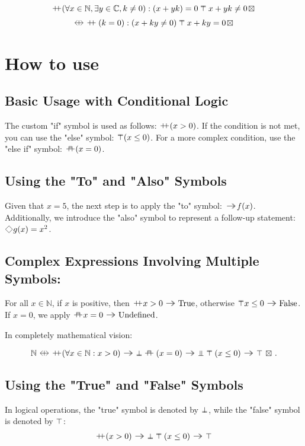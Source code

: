 \documentclass{iac}
\begin{document}
$$ \ifL (\forall x \in \mathbb{N}, \exists y \in \mathbb{C}, k\not= 0) : (x + yk) = 0 \elseL x + yk \not= 0 \doneL$$
$$ \logicalEquL \ifL (k = 0) : (x + ky \not= 0) \elseL x + ky = 0 \doneL $$

\section{How to use}

\subsection{Basic Usage with Conditional Logic}

The custom "if" symbol is used as follows: $\ifL (x > 0)$. 
If the condition is not met, you can use the "else" symbol: $\elseL (x \leq 0)$.
For a more complex condition, use the "else if" symbol: $\elifL (x = 0)$.

\subsection{Using the "To" and "Also" Symbols}

Given that $x = 5$, the next step is to apply the "to" symbol: $\toL f(x)$.
Additionally, we introduce the "also" symbol to represent a follow-up statement: 
$\alsoL g(x) = x^2$.

\subsection{Complex Expressions Involving Multiple Symbols:}

For all $x \in \mathbb{N}$, if $x$ is positive, then $\ifL x > 0 \toL \text{True}$, 
otherwise $\elseL x \leq 0 \toL \text{False}$.
If $x = 0$, we apply $\elifL x = 0 \toL \text{Undefined}$.

In completely mathematical vision:

$$ \mathbb{N} \logicalEquL \ifL (\forall x \in \mathbb{N} : x > 0) \toL \trueL \elifL (x = 0) \toL \undefinedL \elseL (x \leq 0) \toL \falseL \doneL. $$

\subsection{Using the "True" and "False" Symbols}

In logical operations, the "true" symbol is denoted by $\trueL$, while the "false" symbol is denoted by $\falseL$:
$$\ifL (x > 0) \toL \trueL  \elseL (x \leq 0) \toL \falseL$$
\end{document}
